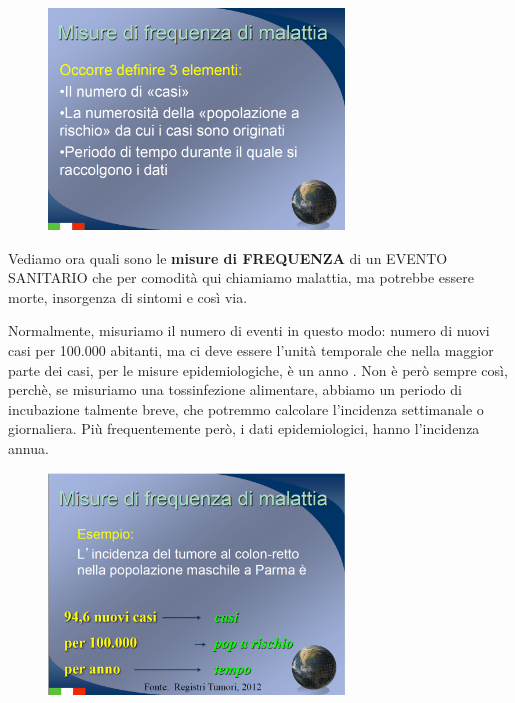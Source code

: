 \begin{figure}[!ht]
\centering
	\includegraphics[width=0.7\textwidth]{03/image3.png}
\end{figure}

Vediamo ora quali sono le \textbf{misure di FREQUENZA} di un EVENTO
SANITARIO che per comodità qui chiamiamo malattia, ma potrebbe essere
morte, insorgenza di sintomi e così via.

Normalmente, misuriamo il numero di eventi in questo modo: numero di
nuovi casi per 100.000 abitanti, ma ci deve essere l'unità temporale che
nella maggior parte dei casi, per le misure epidemiologiche, è un anno .
Non è però sempre così, perchè, se misuriamo una tossinfezione
alimentare, abbiamo un periodo di incubazione talmente breve, che
potremmo calcolare l'incidenza settimanale o giornaliera. Più
frequentemente però, i dati epidemiologici, hanno l'incidenza annua.

\begin{figure}[!ht]
\centering
	\includegraphics[width=0.7\textwidth]{03/image4.png}
\end{figure}

